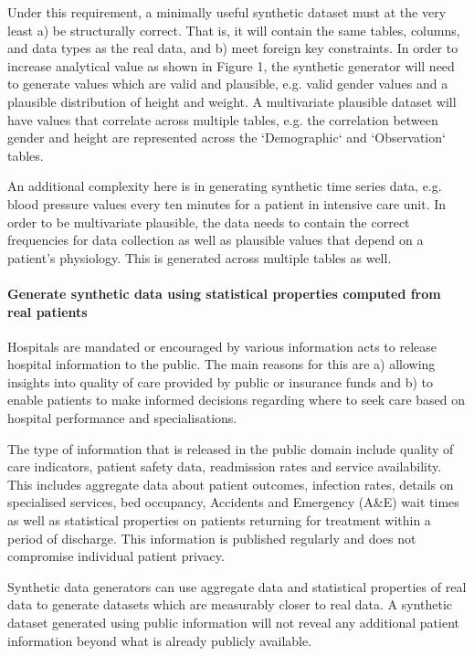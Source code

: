 \documentclass[11pt]{article}
\begin{document}
Under this requirement, a minimally useful synthetic dataset must at the very least a) be structurally correct. That is, it will contain the same tables, columns, and data types as the real data, and b) meet foreign key constraints. In order to increase analytical value as shown in Figure 1, the synthetic generator will need to generate values which are valid and plausible, e.g. valid gender values and a plausible distribution of height and weight.  A multivariate plausible dataset will have values that correlate across multiple tables, e.g. the correlation between gender and height are represented across the `Demographic` and `Observation` tables. 

An additional complexity here is in generating synthetic time series data, e.g. blood pressure values every ten minutes for a patient in intensive care unit. In order to be multivariate plausible, the data needs to contain the correct frequencies for data collection as well as plausible values that depend on a patient's physiology. This is generated across multiple tables as well.  

\paragraph{Generate synthetic data using statistical properties computed from real patients}
Hospitals are mandated or encouraged by various information acts to release hospital information to the public. The main reasons for this are a) allowing insights into quality of care provided by public or insurance funds and b) to enable patients to make informed decisions regarding where to seek care based on hospital performance and specialisations\cite{Werner2005}. 

The type of information that is released in the public domain include quality of care indicators, patient safety data, readmission rates and service availability. This includes aggregate data about patient outcomes, infection rates, details on specialised services, bed occupancy, Accidents and Emergency (A\&E) wait times as well as statistical properties on patients returning for treatment within a period of discharge. This information is published regularly and does not compromise individual patient privacy.  

Synthetic data generators can use aggregate data and statistical properties of real data to generate datasets which are measurably closer to real data. A synthetic dataset generated using public information will not reveal any additional patient information beyond what is already publicly available.
\end{document}
